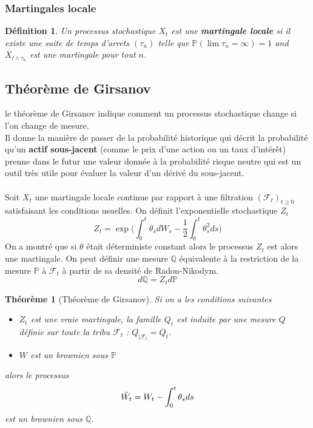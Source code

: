 \documentclass[a4paper]{article}
\newtheorem{theorem}{Théorème}[section]
\newtheorem{definition}{Définition}
\begin{document}
\subsubsection{Martingales locale}
\begin{definition}
Un processus stochastique $X_t$ est une \textbf{martingale locale} si il existe une suite de temps d'arrets $(\tau_n)$ telle que $\mathbb{P}(\lim \tau_n = \infty)=1$ and $X_{t\wedge\tau_n}$ est une martingale pour tout $n$.
\end{definition}

\subsection{Théorème de Girsanov}
le théorème de Girsanov indique comment un processus stochastique change si l'on change de mesure.\\ Il donne la manière de passer de la probabilité historique qui décrit la probabilité qu'un \textbf{actif sous-jacent} (comme le prix d'une action ou un taux d'intérêt) prenne dans le futur une valeur donnée à la probabilité risque neutre qui est un outil très utile pour évaluer la valeur d'un dérivé du sous-jacent. \\ 
\vspace{2mm} \\
Soit $X_{t}$ une martingale locale continue par rapport à une filtration $(\mathcal{F}_t)_{t \geq 0}$ satisfaisant les conditions usuelles. On définit l'exponentielle stochastique $Z_t$
\begin{equation}
    Z_t = \exp{\bigg( \int_{0}^{t} \theta_s dW_s - \frac{1}{2} \int_{0}^{t} \theta^2_s ds \bigg)}
\end{equation}
On a montré que si $\theta$ était déterministe constant alors le processus $Z_t$ est alors une martingale. On peut définir une mesure $\mathbb{Q}$ équivalente à la restriction de la mesure $\mathbb{P}$ à $\mathcal{F}_{t}$ à partir de sa densité de Radon-Nikodym. 
\begin{equation}
    d \mathbb{Q} = Z_t d \mathbb{P}
\end{equation}
\begin{theorem}[Théorème de Girsanov]
Si on a les conditions suivantes
\begin{itemize}
    \item $Z_t$ est une vraie martingale, la famille $Q_{t}$ est induite par une mesure $Q$ définie sur toute la tribu $\mathcal{F}_t$ : $Q_{|\mathcal{F}_t} = Q_t$.
    \item $W$ est un brownien sous $\mathbb{P}$
\end{itemize}
alors le processus 
\begin{equation}
    \Tilde{W_t} = W_t - \int_{0}^{t} \theta_s ds
\end{equation}
est un brownien sous $\mathbb{Q}$. 
 \\

\end{theorem}
\end{document}
